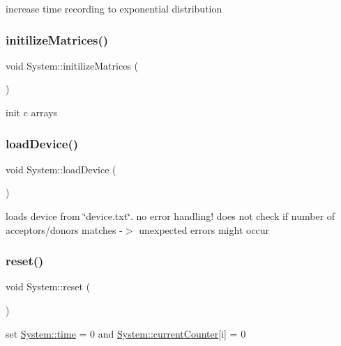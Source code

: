 increase time recording to exponential distribution \mbox{\label{classSystem_a4fddf46176e76cc8d9e1ef91d38d82be}} 
\subsubsection{\texorpdfstring{initilize\+Matrices()}{initilizeMatrices()}}
{\footnotesize\ttfamily void System\+::initilize\+Matrices (\begin{DoxyParamCaption}{ }\end{DoxyParamCaption})}

init c arrays \mbox{\label{classSystem_abe7a2b35b346ac9d823b5431d277d391}} 
\subsubsection{\texorpdfstring{load\+Device()}{loadDevice()}}
{\footnotesize\ttfamily void System\+::load\+Device (\begin{DoxyParamCaption}{ }\end{DoxyParamCaption})}

loads device from \char`\"{}device.\+txt\char`\"{}. no error handling! does not check if number of acceptors/donors matches -\/$>$ unexpected errors might occur \mbox{\label{classSystem_a2029214f3faeefd335b67b2264b61fe5}} 
\subsubsection{\texorpdfstring{reset()}{reset()}}
{\footnotesize\ttfamily void System\+::reset (\begin{DoxyParamCaption}{ }\end{DoxyParamCaption})}

set \hyperlink{classSystem_aa9e002a5f2f169e37c545b76ee67e724}{System\+::time} = 0 and \hyperlink{classSystem_a8d4858c73f66a84785384ff1fb741e7e}{System\+::current\+Counter}\mbox{[}i\mbox{]} = 0 \mbox{\label{classSystem_a94a96fbd71935aac883f3d9e026661ac}} 
